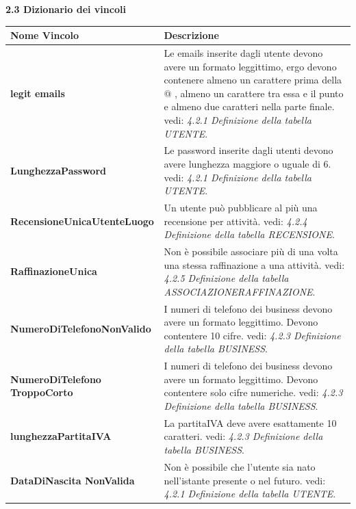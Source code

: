 \documentclass[a4paper,12pt]{article}
\begin{document}
\newpage\null{}\setcounter{page}{10}
\vspace{-2cm}
\begin{flushleft}
{\bf 2.3 Dizionario dei vincoli} 
\vspace{+1cm}
\begin{table}[htbp]
\begin{tabular}[c]{| m{6cm} | m{10cm} |}
\hline
\bf Nome Vincolo&\bf Descrizione\\
\hline

{\bf legit emails}
&\small Le emails inserite dagli utente devono avere un formato leggittimo, ergo devono contenere almeno un carattere prima della @ , almeno un carattere tra essa e il punto e almeno due caratteri nella parte
finale.
vedi: {\it 4.2.1 Definizione della tabella UTENTE}.
\\
\hline

{\bf LunghezzaPassword}
&\small Le password inserite dagli utenti devono avere lunghezza maggiore o uguale di 6.
vedi: {\it 4.2.1 Definizione della tabella UTENTE}.
\\
\hline

{\bf RecensioneUnicaUtenteLuogo}
&\small Un utente può pubblicare al più una recensione per attività.
vedi: {\it 4.2.4 Definizione della tabella RECENSIONE}.
\\
\hline

{\bf RaffinazioneUnica}
&\small Non è possibile associare più di una volta una stessa raffinazione a una attività.
vedi: {\it 4.2.5 Definizione della tabella ASSOCIAZIONERAFFINAZIONE}.
\\
\hline

{\bf NumeroDiTelefonoNonValido}
&\small I numeri di telefono dei business devono avere un formato leggittimo. Devono contentere 10 cifre.
vedi: {\it 4.2.3 Definizione della tabella BUSINESS}.
\\
\hline

{\bf NumeroDiTelefono
TroppoCorto}
&\small I numeri di telefono dei business devono avere un formato leggittimo. Devono contentere solo cifre numeriche.
vedi: {\it 4.2.3 Definizione della tabella BUSINESS}.
\\
\hline

{\bf lunghezzaPartitaIVA}
&\small La partitaIVA deve avere esattamente 10 caratteri.
vedi: {\it 4.2.3 Definizione della tabella BUSINESS}.
\\
\hline

{\bf DataDiNascita
NonValida}
&\small Non è possibile che l'utente sia nato nell'istante presente o nel futuro.
vedi: {\it 4.2.1 Definizione della tabella UTENTE}.
\\
\hline


\end{tabular}
\end{table}
\end{flushleft}
\end{document}
